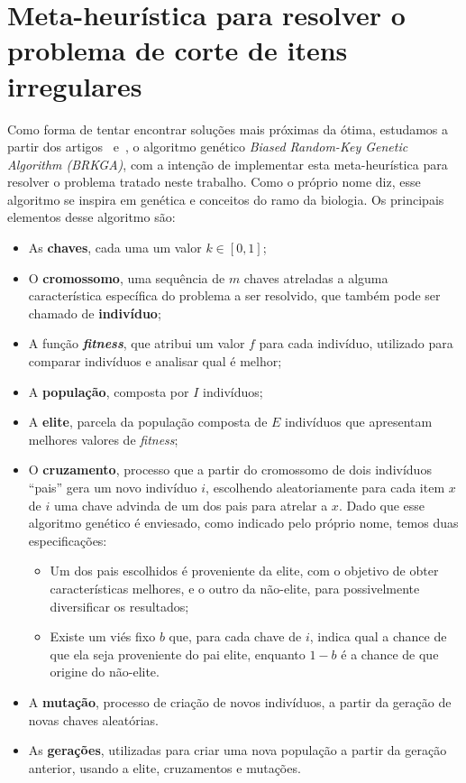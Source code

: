 \documentclass{article}
\begin{document}
\section{Meta-heurística para resolver o problema de corte de itens irregulares} \label{sec:BRKGA}

Como forma de tentar encontrar soluções mais próximas da ótima, estudamos a partir dos artigos~\cite{key} e~\cite{containers}, o algoritmo genético {\it Biased Random-Key Genetic Algorithm (BRKGA)}, com a intenção de implementar esta meta-heurística para resolver o problema tratado neste trabalho. Como o próprio nome diz, esse algoritmo se inspira em genética e conceitos do ramo da biologia. %
Os principais elementos desse algoritmo são:
\begin{itemize}
    \item As {\bf chaves}, cada uma um valor $k \in [0,1]$;
    \item O {\bf cromossomo}, uma sequência de $m$ chaves atreladas a alguma característica específica do problema a ser resolvido, que também pode ser chamado de {\bf indivíduo};
    \item A função \textbf {\textit {fitness}}, que atribui um valor $f$ para cada indivíduo, utilizado para comparar indivíduos e analisar qual é melhor;
    \item A {\bf população}, composta por $I$ indivíduos;
    \item A {\bf elite}, parcela da população composta de $E$ indivíduos que apresentam melhores valores de {\it fitness};
    \item O {\bf cruzamento}, processo que a partir do cromossomo de dois indivíduos ``pais'' gera um novo indivíduo $i$, escolhendo aleatoriamente para cada item $x$ de $i$ uma chave advinda de um dos pais para atrelar a $x$. Dado que esse algoritmo genético é enviesado, como indicado pelo próprio nome, temos duas especificações:
    \begin{itemize}
        \item Um dos pais escolhidos é proveniente da elite, com o objetivo de obter características melhores, e o outro da não-elite, para possivelmente diversificar os resultados;
        \item Existe um viés fixo $b$ que, para cada chave de $i$, indica qual a chance de que ela seja proveniente do pai elite, enquanto $1-b$ é a chance de que origine do não-elite.
    \end{itemize}
    \item A {\bf mutação}, processo de criação de novos indivíduos, a partir da geração de novas chaves aleatórias.
    \item As {\bf gerações}, utilizadas para criar uma nova população a partir da geração anterior, usando a elite, cruzamentos e mutações. 
\end{itemize}
\end{document}
